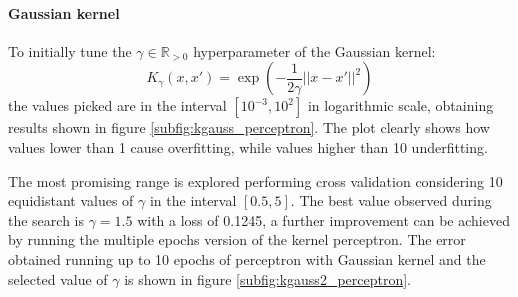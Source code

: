 \documentclass{article}
\begin{document}
\paragraph{Gaussian kernel}
To initially tune the $\gamma \in \mathbb{R}_{>0}$ hyperparameter of the Gaussian kernel:
\begin{equation}
	K_\gamma(x, x') = \exp\left(-\frac{1}{2\gamma} ||x-x'||^2\right)
\end{equation}
the values picked are in the interval $[10^{-3}, 10^2]$ in logarithmic scale, obtaining results shown in figure \ref{subfig:kgauss_perceptron}. The plot clearly shows how values lower than 1 cause overfitting, while values higher than 10 underfitting. 

The most promising range is explored performing cross validation considering 10 equidistant values of $\gamma$ in the interval $[0.5, 5]$. The best value observed during the search is $\gamma=1.5$ with a loss of 0.1245, a further improvement can be achieved by running the multiple epochs version of the kernel perceptron. The error obtained running up to 10 epochs of perceptron with Gaussian kernel and the selected value of $\gamma$ is shown in figure \ref{subfig:kgauss2_perceptron}.
\end{document}

